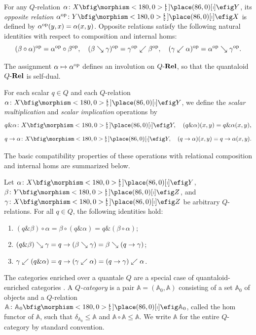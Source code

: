 \documentclass{tac}
\begin{document}
For any \(Q\)-relation \(\alpha\colon X\nto Y\), its \emph{opposite relation} \(\alpha^\op\colon Y\nto X\) is defined by \(\alpha^{\mathrm{op}}(y,x)=\alpha(x,y)\). Opposite relations satisfy the following natural identities with respect to composition and internal homs:
\begin{equation*}
(\beta\circ\alpha)^{\mathrm{op}}=\alpha^{\mathrm{op}}\circ\beta^{\mathrm{op}},\quad
(\beta\searrow\gamma)^{\mathrm{op}}=\gamma^{\mathrm{op}}\swarrow\beta^{\mathrm{op}},\quad
(\gamma\swarrow\alpha)^{\mathrm{op}}=\alpha^{\mathrm{op}}\searrow\gamma^{\mathrm{op}}.
\end{equation*}

\begin{proposition} \label{QRel self-dual}
The assignment \(\alpha\mapsto \alpha^{\mathrm{op}}\) defines an involution on \(Q\text{-}\mathbf{Rel}\), so that the quantaloid \(Q\text{-}\mathbf{Rel}\) is self-dual.
\end{proposition}

For each scalar \(q\in Q\) and each \(Q\)-relation \(\alpha\colon X\nto Y\), we define the \emph{scalar multiplication} and \emph{scalar implication} operations by
\begin{equation*}
q\&\alpha\colon X\nto Y,\quad (q\&\alpha)(x,y)=q\&\alpha(x,y),
\end{equation*}
\begin{equation*}
q\ra\alpha\colon X\nto Y,\quad (q\ra\alpha)(x,y)=q\ra\alpha(x,y).
\end{equation*}

The basic compatibility properties of these operations with relational composition and internal homs are summarized below.

\begin{proposition} \label{prop:scalar}
Let \(\alpha\colon X\nto Y\), \(\beta\colon Y\nto Z\), and \(\gamma\colon X\nto Z\) be arbitrary \(Q\)-relations. For all \(q\in Q\), the following identities hold:
\begin{enumerate}[label={\rm(\arabic*)}]
\item \((q\&\beta)\circ\alpha=\beta\circ(q\&\alpha)=q\&(\beta\circ\alpha)\);
\item \((q\&\beta)\searrow\gamma=q\rightarrow(\beta\searrow\gamma)=\beta\searrow(q\rightarrow\gamma)\);
\item \(\gamma\swarrow(q\&\alpha)=q\rightarrow(\gamma\swarrow\alpha)=(q\rightarrow\gamma)\swarrow\alpha\).
\end{enumerate}
\end{proposition}

The categories enriched over a quantale $Q$ are a special case of quantaloid-enriched categories \cite{Stubbe2005a,Stubbe2005b}.  
A \emph{\(Q\)-category} is a pair \(\mathbb{A}=(\mathbb{A}_0,\mathbb{A})\) consisting of a set \(\mathbb{A}_0\) of objects and a \(Q\)-relation \(\mathbb{A}\colon\mathbb{A}_0\nto\mathbb{A}_0\), called the hom functor of \(\mathbb{A}\), such that \(\delta_{\mathbb{A}_0}\leq\mathbb{A}\) and \(\mathbb{A}\circ\mathbb{A}\leq\mathbb{A}\). We write \(\mathbb{A}\) for the entire \(Q\)-category by standard convention.
\end{document}
